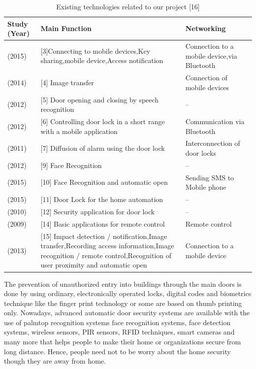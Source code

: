 \documentclass[twoside,a4paper,16pt]{book}
\begin{document}
{{\begin{center}
	\begin{table}[h!]
		\centering
		\begin{tabular}{|p{2cm}|p{6cm}|p{5cm}|}
			\hline
	Study (Year) & Main Function & Networking\\
	\hline	
	(2015) & [3]Connecting to mobile devices,Key sharing,mobile device,Access notification & Connection to a mobile device,via Bluetooth\\
	\hline
	(2014) & [4] Image transfer & Connection of mobile devices\\
	\hline
	(2012) & [5] Door opening and closing by speech recognition & –	\\
	\hline
	(2012) & [6] Controlling door lock in a short range with a mobile application & Communication via Bluetooth\\
	\hline
	(2011) & [7] Diffusion of alarm using the door lock & Interconnection of door locks\\
	\hline
	(2012) & [9] Face Recognition & –\\
	\hline
	(2015) & [10] Face Recognition and automatic open & Sending SMS to Mobile phone\\
	\hline
	(2015) & [11] Door Lock for the home automation & –\\
	\hline
	(2010) & [12] Security application for door lock & –\\
	\hline
	(2009) & [14] Basic applications for remote control & Remote control\\
	\hline
	(2013) & [15] Impact detection / notification,Image transfer,Recording access information,Image recognition / remote control,Recognition of user proximity and automatic open & Connection to a	mobile device\\
	\hline	
		\end{tabular}
		\caption{Existing  technologies related to our project [16]}	
	\end{table}
\end{center}
The prevention of unauthorized entry into buildings
through the main doors is done by using ordinary,
electronically operated locks, digital codes and biometrics
technique like the finger print technology or some are
based on thumb printing only. Nowadays, advanced
automatic door security systems are available with the use
of palmtop recognition systems face recognition systems,
face detection systems, wireless sensors, PIR sensors,
RFID techniques, smart cameras and many more that helps
people to make their home or organizations secure from
long distance. Hence, people need not to be worry about
the home security though they are away from home.
}}
\end{document}
